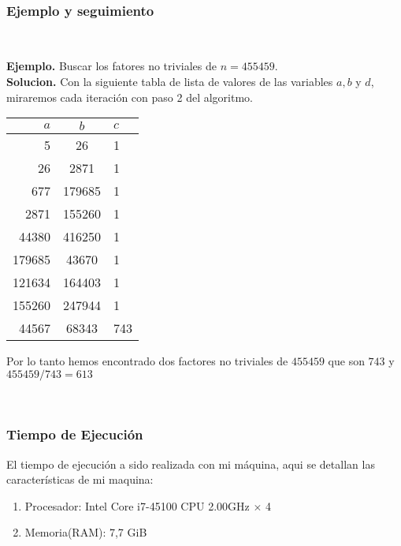 \documentclass[11pt, conference]{IEEEtran}
\begin{document}
\

\subsubsection[Ejemplo y seguimiento]{\textbf{Ejemplo y seguimiento}}

\

\textbf{Ejemplo. }Buscar los fatores no triviales de $n = 455459$.\\
\textbf{Solucion. }Con la siguiente tabla de lista de valores de las variables $a,b$ y $d$, miraremos cada iteración con paso 2 del algoritmo.

\begin{table}[htb]
	\begin{center}
		\begin{tabular}{|r|c|l|}
			\hline
			$a$ & $b$ & $c$\\
			\hline\hline
			5 & 26 & 1 \\
			\hline
			26 & 2871 & 1 \\
			\hline
			677 & 179685 & 1 \\
			\hline
			2871 & 155260 & 1 \\
			\hline
			44380 & 416250 & 1 \\
			\hline
			179685 & 43670 & 1 \\
			\hline
			121634 & 164403 & 1 \\
			\hline
			155260 & 247944 & 1 \\
			\hline
			44567 & 68343 & 743 \\
			\hline
		\end{tabular}
	\end{center}
\end{table}

Por lo tanto hemos encontrado dos factores no triviales de $455459$ que son $743$ y $455459/743=613$ 

\

\subsubsection[Tiempo de Ejecución]{\textbf{Tiempo de Ejecución}}
El tiempo de ejecución a sido realizada con mi máquina, aqui se detallan las características de mi maquina:
\begin{enumerate}
	\item Procesador: Intel Core i7-45100 CPU 2.00GHz $\times$ 4
	\item Memoria(RAM): 7,7 GiB
\end{enumerate}
\end{document}

